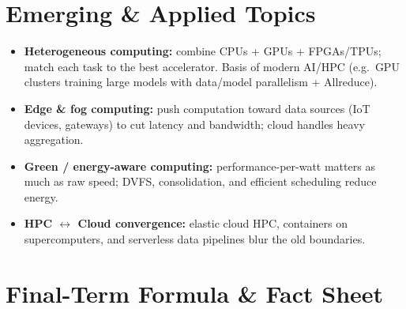 \documentclass[11pt,a4paper]{article}
\begin{document}
\section{Emerging \& Applied Topics}

\begin{itemize}[leftmargin=*, itemsep=3pt]
  \item \textbf{Heterogeneous computing:} combine CPUs + GPUs + FPGAs/TPUs; match each task to the best accelerator. Basis of modern AI/HPC (e.g.\ GPU clusters training large models with data/model parallelism + Allreduce).
  \item \textbf{Edge \& fog computing:} push computation toward data sources (IoT devices, gateways) to cut latency and bandwidth; cloud handles heavy aggregation.
  \item \textbf{Green / energy-aware computing:} performance-per-watt matters as much as raw speed; DVFS, consolidation, and efficient scheduling reduce energy.
  \item \textbf{HPC $\leftrightarrow$ Cloud convergence:} elastic cloud HPC, containers on supercomputers, and serverless data pipelines blur the old boundaries.
\end{itemize}

\newpage
\section*{Final-Term Formula \& Fact Sheet}
\end{document}

